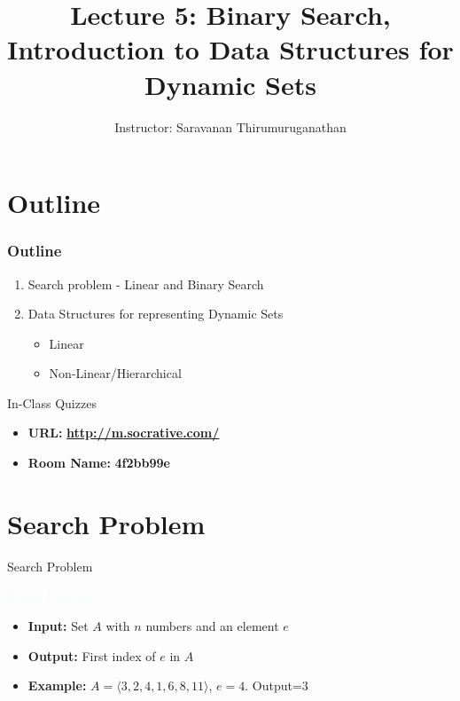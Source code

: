 \documentclass{beamer}
\title[Saravanan Thirumuruganathan] 
{Lecture 5: Binary Search, Introduction to Data Structures for Dynamic Sets}
\author[CSE 5311] 
{Instructor: Saravanan Thirumuruganathan}
\date[]
\newcommand{\tblue}[1]{{\Large {\textcolor{azure}{#1}}}}
\begin{document}
\begin{frame}
  \titlepage
\end{frame}


\section{Outline}

\begin{frame}
\frametitle {Outline}
\begin{enumerate}
\item Search problem - Linear and Binary Search
\item Data Structures for representing Dynamic Sets
\begin{itemize}
    \item Linear
    \item Non-Linear/Hierarchical 
\end{itemize}
\end{enumerate}
\end{frame}

\begin{frame}{In-Class Quizzes}
\begin{itemize}
\item {\Large {\bf URL:}} {\LARGE \bf \url{http://m.socrative.com/}} 
\item {\Large {\bf Room Name:} {\LARGE \bf 4f2bb99e}}
\end{itemize}
\end{frame}

\section{Search Problem}


\begin{frame}{Search Problem}

\tblue{Search Problem}
\begin{itemize}
\item {\bf Input:} Set $A$ with $n$ numbers and an element $e$
\item {\bf Output:} First index of $e$ in $A$
\item {\bf Example:} $A = \langle 3, 2, 4, 1, 6, 8, 11 \rangle$, $e=4$. Output=$3$
\end{itemize}
\end{frame}
\end{document}
